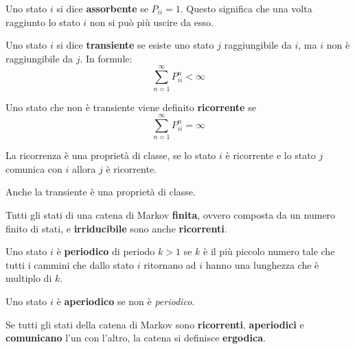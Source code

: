 \begin{definizione}
    Uno stato $i$ si dice \textbf{assorbente} se $P_{ii} = 1$. Questo significa
    che una volta raggiunto lo stato $i$ non si può più uscire da esso.
\end{definizione}
\begin{definizione}
    Uno stato $i$ si dice \textbf{transiente} se esiste uno stato $j$ raggiungibile
    da $i$, ma $i$ non è raggiungibile da $j$. In formule:
    \begin{equation*}
        \sum_{n=1}^{\infty} P_{ii}^n < \infty
    \end{equation*}
\end{definizione}
\begin{definizione}
    Uno stato che non è transiente viene definito \textbf{ricorrente} se
    \begin{equation*}
        \sum_{n=1}^{\infty} P_{ii}^n = \infty
    \end{equation*}
\end{definizione}
\begin{nota}
    La ricorrenza è una proprietà di classe, se lo stato $i$ è ricorrente e
    lo stato $j$ comunica con $i$ allora $j$ è ricorrente.
\end{nota}
\begin{nota}
    Anche la transiente è una proprietà di classe.
\end{nota}
\begin{nota}
    Tutti gli stati di una catena di Markov \textbf{finita}, ovvero composta da
    un numero finito di stati, e \textbf{irriducibile} sono anche \textbf{ricorrenti}.
\end{nota}
\begin{definizione}
    Uno stato $i$ è \textbf{periodico} di periodo $k > 1$ se $k$ è il più piccolo
    numero tale che tutti i cammini che dallo stato $i$ ritornano ad $i$ hanno una
    lunghezza che è multiplo di $k$.
\end{definizione}
\begin{definizione}
    Uno stato $i$ è \textbf{aperiodico} se non è \textit{periodico}.
\end{definizione}
\begin{definizione}
    Se tutti gli stati della catena di Markov sono \textbf{ricorrenti}, \textbf{aperiodici}
    e \textbf{comunicano} l'un con l'altro, la catena si definisce \textbf{ergodica}.
\end{definizione}
